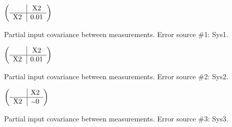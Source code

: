 \begin{table}[H]
\scriptsize
\begin{center}
\renewcommand{\arraystretch}{1.1}
\begin{math}\left(\begin{array}{c|c}
 & \mathrm{X2} \\
\hline
\mathrm{X2} \hspace*{2pt} &       0.01 \\
\end{array}\right)\end{math}
\caption{Partial input covariance between measurements. Error source \#1: Sys1.}
\renewcommand{\arraystretch}{1}
\end{center}
\end{table}
\begin{table}[H]
\scriptsize
\begin{center}
\renewcommand{\arraystretch}{1.1}
\begin{math}\left(\begin{array}{c|c}
 & \mathrm{X2} \\
\hline
\mathrm{X2} \hspace*{2pt} &       0.01 \\
\end{array}\right)\end{math}
\caption{Partial input covariance between measurements. Error source \#2: Sys2.}
\renewcommand{\arraystretch}{1}
\end{center}
\end{table}
\begin{table}[H]
\scriptsize
\begin{center}
\renewcommand{\arraystretch}{1.1}
\begin{math}\left(\begin{array}{c|c}
 & \mathrm{X2} \\
\hline
\mathrm{X2} \hspace*{2pt} &  {\scriptstyle \sim }0 \\
\end{array}\right)\end{math}
\caption{Partial input covariance between measurements. Error source \#3: Sys3.}
\renewcommand{\arraystretch}{1}
\end{center}
\end{table}
\clearpage
